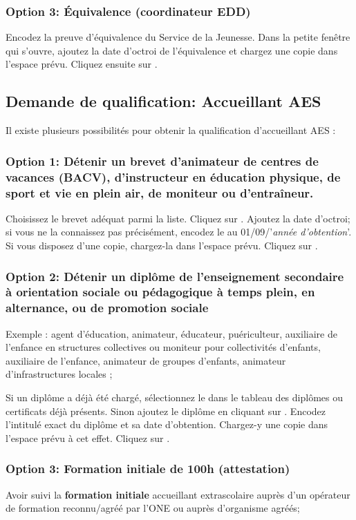 \subsubsection{Option 3: Équivalence (coordinateur EDD)}
Encodez la preuve d'équivalence du Service de la Jeunesse. Dans la petite fenêtre qui s'ouvre, ajoutez la date d'octroi de l'équivalence et chargez une copie dans l'espace prévu. Cliquez ensuite sur . 

\subsection{Demande de qualification: Accueillant AES} \label{ssec:accueillant_aes}
Il existe plusieurs possibilités pour obtenir la qualification d’accueillant AES :


\subsubsection{Option 1: Détenir un \textbf{brevet} d'animateur de centres de vacances (BACV), d'instructeur en éducation physique, de sport et vie en plein air, de moniteur ou d'entraîneur.}

Choisissez le brevet adéquat parmi la liste. Cliquez sur . Ajoutez la date d'octroi; si vous ne la connaissez pas précisément, encodez le au 01/09/'\textit{année d'obtention}'. Si vous disposez d'une copie, chargez-la dans l'espace prévu. Cliquez sur .


\subsubsection{Option 2: Détenir un \textbf{diplôme de l’enseignement secondaire à orientation sociale ou pédagogique} à temps plein, en alternance, ou de promotion sociale}
 Exemple : agent d’éducation, animateur, éducateur, puériculteur, auxiliaire de l’enfance en structures collectives ou moniteur pour collectivités d’enfants, auxiliaire de l’enfance, animateur de groupes d’enfants, animateur d’infrastructures locales ;

Si un diplôme a déjà été chargé, sélectionnez le dans le tableau des diplômes ou certificats déjà présents.
Sinon ajoutez le diplôme en cliquant sur . Encodez l'intitulé exact du diplôme et sa date d'obtention. Chargez-y une copie dans l'espace prévu à cet effet. Cliquez sur .

\subsubsection{Option 3: Formation initiale de 100h (attestation)}
Avoir suivi la \textbf{formation initiale} accueillant extrascolaire auprès d'un opérateur de formation reconnu/agréé par l'ONE ou auprès d'organisme agréés;


